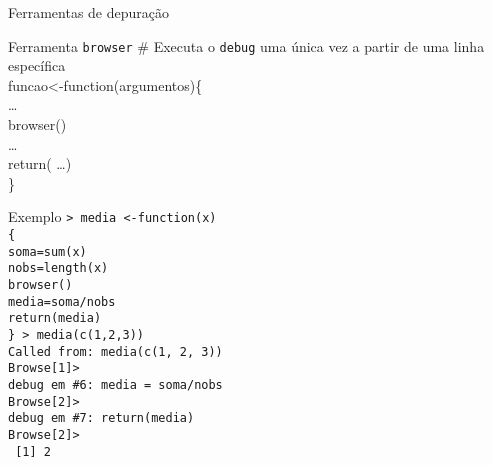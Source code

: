 \documentclass[handout]{beamer}
\begin{document}
  \begin{frame}{Ferramentas de depuração}

    \begin{block}{Ferramenta \texttt{browser}}
    \# Executa o \texttt{debug} uma única vez a partir de uma linha específica \\
    funcao<-function(argumentos)\{\\
  \hspace{30pt}\ldots\\
  \hspace{30pt} browser()\\
  \hspace{30pt}\ldots\\
   \hspace{30pt}return( \dots)\\
\}    
    \end{block}
    
  \end{frame}
  \begin{frame}{Exemplo}
\texttt{> media <-function(x)\\
\hspace{20pt}    \{\\
\hspace{20pt}\hspace{20pt}        soma=sum(x)\\
\hspace{20pt}\hspace{20pt}        nobs=length(x)\\
\hspace{20pt}\hspace{20pt}        browser()\\
\hspace{20pt}\hspace{20pt}        media=soma/nobs\\
 \hspace{20pt}\hspace{20pt}       return(media)\\
\hspace{20pt}    \}
> media(c(1,2,3))\\
Called from: media(c(1, 2, 3))\\
Browse[1]> \\
debug em \#6: media = soma/nobs\\
Browse[2]>\\ 
debug em \#7: return(media)\\
Browse[2]> \\
~[1] 2}    
  \end{frame}
\end{document}
